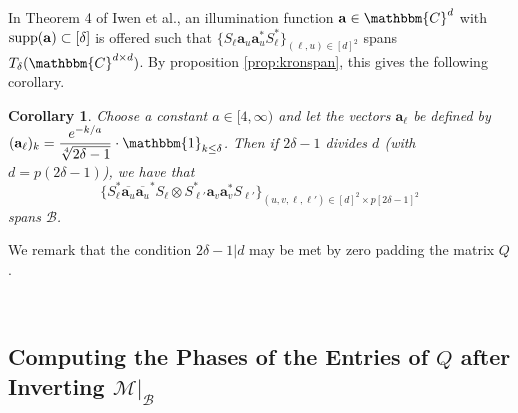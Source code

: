 \documentclass[]{spie}  %
\newtheorem{cor}{Corollary}
\def \a {\mathbf a}
\def \bar {\overline}
\def \C {\mathbbm{C}}
\def \B {\mathcal{B}}
\def \supp {{\rm supp}}
\begin{document}
In Theorem 4 of Iwen et al.\cite{iwen2016fast}, an illumination function $\a \in \C^d$ with $\supp(\a) \subset [\delta]$ is offered such that $\{S_\ell \a_u \a_u^* S_\ell^*\}_{(\ell, u) \in [d]^2}$ spans $T_\delta(\C^{d \times d})$.  By proposition \ref{prop:kronspan}, this gives the following corollary.

\begin{cor}
  Choose a constant $a \in [4, \infty)$ and let the vectors $\a_\ell$ be defined by $(\a_\ell)_k = \dfrac{e^{-k / a}}{\sqrt[4]{2 \delta - 1}} \cdot \mathbbm{1}_{k \le \delta}$.  Then if $2 \delta - 1$ divides $d$ (with $d = p(2 \delta - 1)$), we have that $$\{S_\ell^* \bar{\a_u} \bar{\a_u}^* S_\ell \otimes S_{\ell'}^* \a_v \a_v^* S_{\ell'}\}_{(u, v, \ell, \ell') \in [d]^2 \times p[2 \delta - 1]^2}$$ spans $\B$.
\end{cor}

We remark that the condition $2 \delta - 1 \vert d$ may be met by zero padding the matrix $Q$.

\

\subsection{Computing the Phases of the Entries of $Q$ after Inverting $\mathcal{M} \big|_{\B}$}
\label{sec:Getphases}
\end{document}
